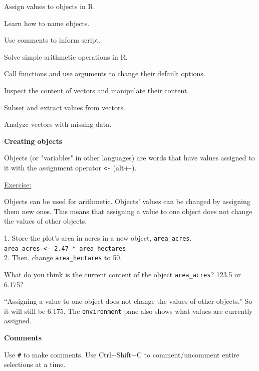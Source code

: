 \documentclass[12pt]{article}
\begin{document}
Assign values to objects in R.

Learn how to name objects.

Use comments to inform script.

Solve simple arithmetic operations in R.

Call functions and use arguments to change their default options.

Inspect the content of vectors and manipulate their content.

Subset and extract values from vectors.

Analyze vectors with missing data.

\color{black}
\vspace{1em}

\textbf{Creating objects}

Objects (or "variables" in other languages) are words that have values assigned to it with the assignment operator \texttt{<-} (alt+-).

\vspace{0.5em}
\begin{addmargin}[1cm]{0cm}
\color{gray}
\underline{Exercise:}

Objects can be used for arithmetic. Objects' values can be changed by assigning them new ones. This means that assigning a value to one object does not change the values of other objects.

1. Store the plot’s area in acres in a new object, \texttt{area\_acres}.
\\\texttt{area\_acres <- 2.47 * area\_hectares}
\\2. Then, change \texttt{area\_hectares} to 50.

What do you think is the current content of the object \texttt{area\_acres}? 123.5 or 6.175?

\color{black}\vspace{0.5em}

``Assigning a value to one object does not change the values of other objects." So it will still be 6.175. The \texttt{environment} pane also shows what values are currently assigned.

\end{addmargin}

\textbf{Comments}

Use \texttt{\#} to make comments. Use Ctrl+Shift+C to comment/uncomment entire selections at a time. 
\end{document}
